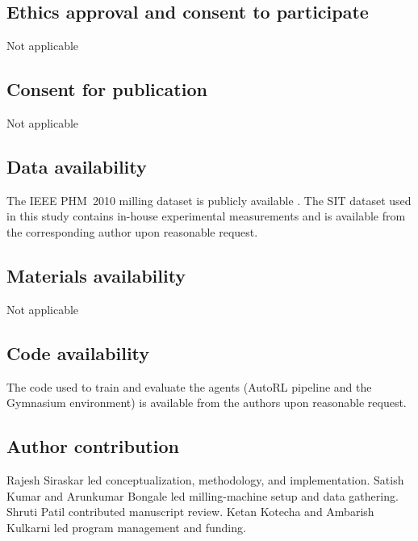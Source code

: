 \documentclass[sn-basic]{sn-jnl} %
\begin{document}
\subsection*{Ethics approval and consent to participate}
Not applicable

\subsection*{Consent for publication}
Not applicable

\subsection*{Data availability}
The IEEE PHM~2010 milling dataset is publicly available \cite{PHMdata2010}. The SIT dataset used in this study contains in-house experimental measurements and is available from the corresponding author upon reasonable request.

\subsection*{Materials availability}
Not applicable

\subsection*{Code availability}
The code used to train and evaluate the agents (AutoRL pipeline and the Gymnasium environment) is available from the authors upon reasonable request.

\subsection*{Author contribution}
Rajesh Siraskar led conceptualization, methodology, and implementation. Satish Kumar and Arunkumar Bongale led milling-machine setup and data gathering. Shruti Patil contributed manuscript review. Ketan Kotecha and Ambarish Kulkarni led program management and funding.
\end{document}

